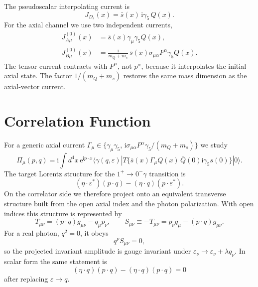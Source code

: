 \documentclass[11pt]{article}
\newcommand{\Ds}{D_s}
\newcommand{\ii}{\mathrm{i}}
\newcommand{\ee}{\mathrm{e}}
\newcommand{\sbar}{\bar s}
\begin{document}
The pseudoscalar interpolating current is
\begin{equation}
  J_{\Ds}(x)=\sbar(x)\,\ii\gamma_5\,Q(x).
\end{equation}
For the axial channel we use two independent currents,
\begin{align}
  J^{(0)}_{A\mu}(x)
  &= \sbar(x)\gamma_\mu\gamma_5 Q(x),\\
  J^{(0)}_{B\mu}(x)
  &= \frac{\ii}{m_Q+m_s}\,
     \sbar(x)\sigma_{\mu\alpha}P^\alpha\gamma_5 Q(x).
\end{align}
The tensor current contracts with $P^\alpha$, not $p^\alpha$, because it
interpolates the initial axial state.  The factor $1/(m_Q+m_s)$ restores the
same mass dimension as the axial-vector current.

\section{Correlation Function}

For a generic axial current $\Gamma_\mu\in\{\gamma_\mu\gamma_5,\,
\ii\sigma_{\mu\alpha}P^\alpha\gamma_5/(m_Q+m_s)\}$ we study
\begin{equation}
  \Pi_\mu(p,q)
  =
  \ii\int d^4x\,\ee^{\ii p\cdot x}
  \langle \gamma(q,\varepsilon)|
  T\{ \sbar(x)\Gamma_\mu Q(x)\,
       \bar Q(0)\ii\gamma_5 s(0)\}
  |0\rangle .
  \label{eq:correlator}
\end{equation}
The target Lorentz structure for the $1^+\to0^-\gamma$ transition is
\begin{equation}
  (\eta\cdot\varepsilon^*)(p\cdot q)
  -(\eta\cdot q)(p\cdot\varepsilon^*).
\end{equation}
On the correlator side we therefore project onto an equivalent transverse
structure built from the open axial index and the photon polarization.
With open indices this structure is represented by
\begin{equation}
  T_{\mu\nu}=(p\cdot q)g_{\mu\nu}-q_\mu p_\nu,
  \qquad
  S_{\mu\nu}\equiv -T_{\mu\nu}=p_\nu q_\mu-(p\cdot q)g_{\mu\nu}.
\end{equation}
For a real photon, $q^2=0$, it obeys
\begin{equation}
  q^\nu S_{\mu\nu}=0,
\end{equation}
so the projected invariant amplitude is gauge invariant under
$\varepsilon_\nu\to\varepsilon_\nu+\lambda q_\nu$.  In scalar form the same
statement is
\begin{equation}
  (\eta\cdot q)(p\cdot q)-(\eta\cdot q)(p\cdot q)=0
\end{equation}
after replacing $\varepsilon\to q$.
\end{document}
